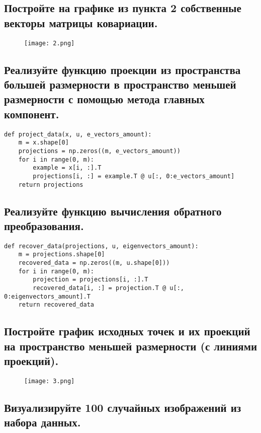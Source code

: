\subsection{Постройте на графике из пункта 2 собственные векторы матрицы ковариации.}

\begin{figure}[h]
\centering
    \texttt{[image: 2.png]}
  \label{sec:purpose:payings}
\end{figure}

\subsection{Реализуйте функцию проекции из пространства большей размерности в пространство меньшей размерности с помощью метода главных компонент.}

\begin{lstlisting}
def project_data(x, u, e_vectors_amount):
    m = x.shape[0]
    projections = np.zeros((m, e_vectors_amount))
    for i in range(0, m):
        example = x[i, :].T
        projections[i, :] = example.T @ u[:, 0:e_vectors_amount]
    return projections
\end{lstlisting}

\subsection{Реализуйте функцию вычисления обратного преобразования.}

\begin{lstlisting}
def recover_data(projections, u, eigenvectors_amount):
    m = projections.shape[0]
    recovered_data = np.zeros((m, u.shape[0]))
    for i in range(0, m):
        projection = projections[i, :].T
        recovered_data[i, :] = projection.T @ u[:, 0:eigenvectors_amount].T
    return recovered_data
\end{lstlisting}

\subsection{Постройте график исходных точек и их проекций на пространство меньшей размерности (с линиями проекций).}

\begin{figure}[h]
\centering
    \texttt{[image: 3.png]}
  \label{sec:purpose:payings}
\end{figure}

\subsection{Визуализируйте 100 случайных изображений из набора данных.}

